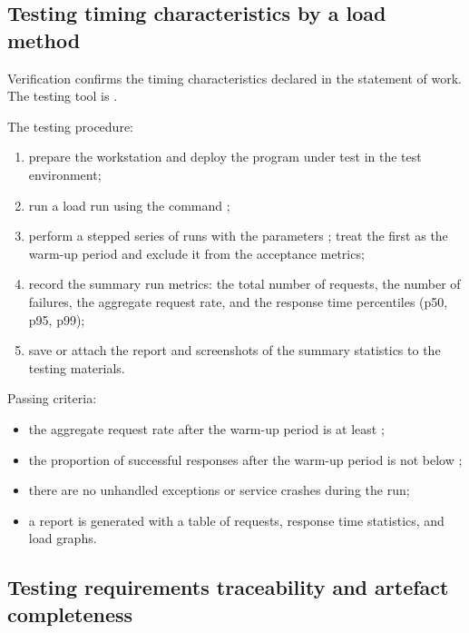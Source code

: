 \documentclass[12pt,a4paper]{extarticle}
\begin{document}
\subsection{Testing timing characteristics by a load method}

\begin{hseExample}
Verification confirms the timing characteristics declared in the statement of work. The testing tool is .

The testing procedure:
\begin{enumerate}[label=\arabic*), leftmargin=1.25cm]
    \item prepare the workstation and deploy the program under test in the test environment;
    \item run a load run using the command ;
    \item perform a stepped series of runs with the parameters ; treat the first  as the warm-up period and exclude it from the acceptance metrics;
    \item record the summary run metrics: the total number of requests, the number of failures, the aggregate request rate, and the response time percentiles (p50, p95, p99);
    \item save or attach the report and screenshots of the summary statistics to the testing materials.
\end{enumerate}

Passing criteria:
\begin{itemize}[nosep, leftmargin=1.25cm]
    \item the aggregate request rate after the warm-up period is at least ;
    \item the proportion of successful responses after the warm-up period is not below ;
    \item there are no unhandled exceptions or service crashes during the run;
    \item a report is generated with a table of requests, response time statistics, and load graphs.
\end{itemize}
\end{hseExample}

\subsection{Testing requirements traceability and artefact completeness}
\end{document}
